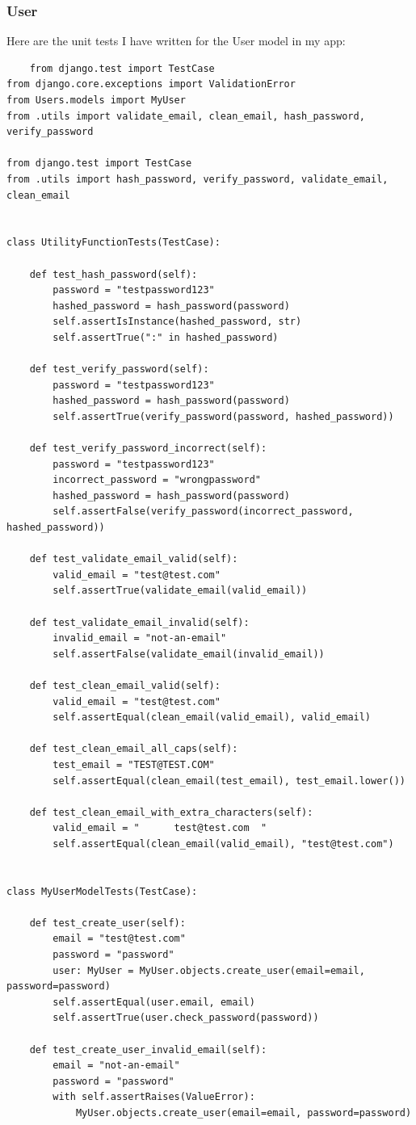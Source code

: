 \subsubsection{User}
Here are the unit tests I have written for the User model in my app:
\begin{verbatim}
    from django.test import TestCase
from django.core.exceptions import ValidationError
from Users.models import MyUser
from .utils import validate_email, clean_email, hash_password, verify_password

from django.test import TestCase
from .utils import hash_password, verify_password, validate_email, clean_email


class UtilityFunctionTests(TestCase):

    def test_hash_password(self):
        password = "testpassword123"
        hashed_password = hash_password(password)
        self.assertIsInstance(hashed_password, str)
        self.assertTrue(":" in hashed_password)

    def test_verify_password(self):
        password = "testpassword123"
        hashed_password = hash_password(password)
        self.assertTrue(verify_password(password, hashed_password))

    def test_verify_password_incorrect(self):
        password = "testpassword123"
        incorrect_password = "wrongpassword"
        hashed_password = hash_password(password)
        self.assertFalse(verify_password(incorrect_password, hashed_password))

    def test_validate_email_valid(self):
        valid_email = "test@test.com"
        self.assertTrue(validate_email(valid_email))

    def test_validate_email_invalid(self):
        invalid_email = "not-an-email"
        self.assertFalse(validate_email(invalid_email))

    def test_clean_email_valid(self):
        valid_email = "test@test.com"
        self.assertEqual(clean_email(valid_email), valid_email)

    def test_clean_email_all_caps(self):
        test_email = "TEST@TEST.COM"
        self.assertEqual(clean_email(test_email), test_email.lower())

    def test_clean_email_with_extra_characters(self):
        valid_email = "      test@test.com  "
        self.assertEqual(clean_email(valid_email), "test@test.com")


class MyUserModelTests(TestCase):

    def test_create_user(self):
        email = "test@test.com"
        password = "password"
        user: MyUser = MyUser.objects.create_user(email=email, password=password)
        self.assertEqual(user.email, email)
        self.assertTrue(user.check_password(password))

    def test_create_user_invalid_email(self):
        email = "not-an-email"
        password = "password"
        with self.assertRaises(ValueError):
            MyUser.objects.create_user(email=email, password=password)
\end{verbatim}

